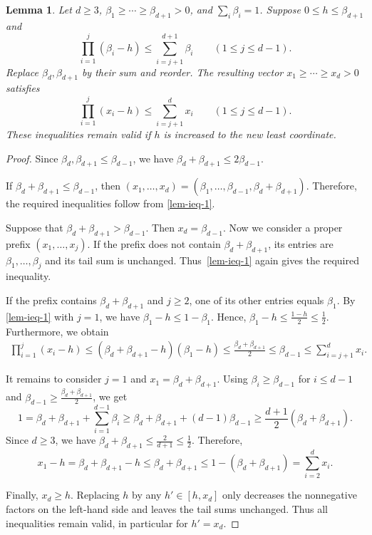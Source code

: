 \documentclass[reqno, 11pt]{article}
\numberwithin{equation}{section}
\newtheorem{lemma}[lemma]{Lemma}
\theoremstyle{definition}
\begin{document}
\begin{lemma}\label{orb:lem:merge}
Let $d\ge3$, $\beta_1\ge\cdots\ge\beta_{d+1}>0$, and
$\sum_i\beta_i=1$. Suppose $0\le h\le\beta_{d+1}$ and
\begin{equation}\label{lem-ieq-1}
\prod_{i=1}^j(\beta_i-h)\le\sum_{i=j+1}^{d+1}\beta_i
 \qquad(1\le j\le d-1).
\end{equation}
Replace $\beta_d,\beta_{d+1}$ by their sum and reorder. The resulting
vector $x_1\ge\cdots\ge x_d>0$ satisfies
\begin{equation}\label{lem-ieq-2}
\prod_{i=1}^j(x_i-h)\le\sum_{i=j+1}^d x_i
 \qquad(1\le j\le d-1).
\end{equation}
These inequalities remain valid if $h$ is increased to the new least
coordinate.
\end{lemma}
\begin{proof}
Since $\beta_d,\beta_{d+1}\le\beta_{d-1}$, we have $\beta_d+\beta_{d+1}\le2\beta_{d-1}$.

If $\beta_d+\beta_{d+1}\le\beta_{d-1}$, then $(x_1,\ldots,x_d)=(\beta_1,\ldots,\beta_{d-1},\beta_d+\beta_{d+1})$. 
Therefore, the required inequalities follow from \eqref{lem-ieq-1}.

Suppose that $\beta_d+\beta_{d+1}>\beta_{d-1}$. Then $x_d=\beta_{d-1}$.
Now we consider a proper prefix $(x_1,\ldots,x_j)$.
If the prefix does not contain $\beta_d+\beta_{d+1}$,
its entries are $\beta_1,\ldots,\beta_j$ and its tail sum is
unchanged. Thus~\eqref{lem-ieq-1} again gives the required inequality.

If the prefix contains $\beta_d+\beta_{d+1}$ and $j\ge2$,
one of its other entries equals $\beta_1$.
By \eqref{lem-ieq-1} with $j=1$, we have $\beta_1-h\le1-\beta_1$. Hence, $\beta_1-h\le\frac{1-h}{2}\le\frac12$. 
Furthermore, we obtain 
\[
\begin{aligned}
\prod_{i=1}^{j}(x_i-h)
\le(\beta_d+\beta_{d+1}-h)(\beta_1-h)\le\frac{\beta_d+\beta_{d+1}}{2}
\le\beta_{d-1}
\le\sum_{i=j+1}^{d}x_i.
\end{aligned}
\]

It remains to consider $j=1$ and $x_1=\beta_d+\beta_{d+1}$.
Using $\beta_i\ge\beta_{d-1}$ for $i\le d-1$ and
$\beta_{d-1}\ge\frac{\beta_d+\beta_{d+1}}{2}$, we get 
\[
1
=\beta_d+\beta_{d+1}+\sum_{i=1}^{d-1}\beta_i
\ge\beta_d+\beta_{d+1}+(d-1)\beta_{d-1}
\ge\frac{d+1}{2}(\beta_d+\beta_{d+1}).
\]
Since $d\ge3$, we have $\beta_d+\beta_{d+1}\le\frac{2}{d+1}\le \frac{1}{2}$.
Therefore,
\[
x_1-h=\beta_d+\beta_{d+1}-h
\le\beta_d+\beta_{d+1}
\le1-(\beta_d+\beta_{d+1})
=\sum_{i=2}^{d}x_i.
\]

Finally, $x_d\ge h$.
Replacing $h$ by any $h'\in[h,x_d]$ only decreases the
nonnegative factors on the left-hand side and leaves the
tail sums unchanged.
Thus all inequalities remain valid, in particular for $h'=x_d$.
\end{proof}
\end{document}
